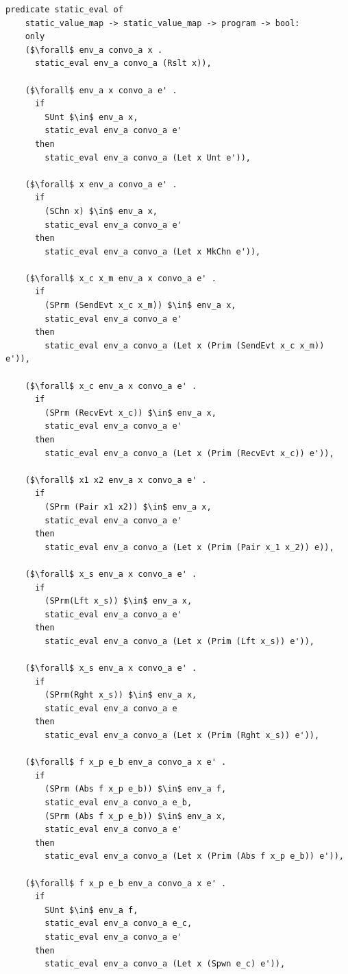 \documentclass{article}
\begin{document}
\begin{lstlisting}[language=logic, mathescape]
  predicate static_eval of
    static_value_map -> static_value_map -> program -> bool:
    only
    ($\forall$ env_a convo_a x .
      static_eval env_a convo_a (Rslt x)),

    ($\forall$ env_a x convo_a e' .
      if 
        SUnt $\in$ env_a x,
        static_eval env_a convo_a e'
      then
        static_eval env_a convo_a (Let x Unt e')),

    ($\forall$ x env_a convo_a e' .
      if 
        (SChn x) $\in$ env_a x,
        static_eval env_a convo_a e'
      then  
        static_eval env_a convo_a (Let x MkChn e')),

    ($\forall$ x_c x_m env_a x convo_a e' .
      if
        (SPrm (SendEvt x_c x_m)) $\in$ env_a x,
        static_eval env_a convo_a e' 
      then
        static_eval env_a convo_a (Let x (Prim (SendEvt x_c x_m)) e')),

    ($\forall$ x_c env_a x convo_a e' . 
      if 
        (SPrm (RecvEvt x_c)) $\in$ env_a x,
        static_eval env_a convo_a e'
      then
        static_eval env_a convo_a (Let x (Prim (RecvEvt x_c)) e')),

    ($\forall$ x1 x2 env_a x convo_a e' .
      if
        (SPrm (Pair x1 x2)) $\in$ env_a x,
        static_eval env_a convo_a e'
      then
        static_eval env_a convo_a (Let x (Prim (Pair x_1 x_2)) e)),

    ($\forall$ x_s env_a x convo_a e' .
      if
        (SPrm(Lft x_s)) $\in$ env_a x,
        static_eval env_a convo_a e' 
      then
        static_eval env_a convo_a (Let x (Prim (Lft x_s)) e')),

    ($\forall$ x_s env_a x convo_a e' .
      if
        (SPrm(Rght x_s)) $\in$ env_a x, 
        static_eval env_a convo_a e
      then
        static_eval env_a convo_a (Let x (Prim (Rght x_s)) e')),

    ($\forall$ f x_p e_b env_a convo_a x e' .
      if
        (SPrm (Abs f x_p e_b)) $\in$ env_a f, 
        static_eval env_a convo_a e_b, 
        (SPrm (Abs f x_p e_b)) $\in$ env_a x, 
        static_eval env_a convo_a e'
      then
        static_eval env_a convo_a (Let x (Prim (Abs f x_p e_b)) e')),

    ($\forall$ f x_p e_b env_a convo_a x e' .
      if
        SUnt $\in$ env_a f, 
        static_eval env_a convo_a e_c, 
        static_eval env_a convo_a e'
      then
        static_eval env_a convo_a (Let x (Spwn e_c) e')),


\end{lstlisting}
\end{document}
